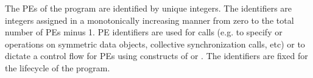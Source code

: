 The \ac{PE}{}s of the \openshmem{} program are identified by unique integers. The identifiers are integers assigned in a monotonically increasing 
manner from zero to the total number of \ac{PE}s minus 1. \ac{PE} identifiers are used for \openshmem{} calls (e.g. to specify \PUT{} or \GET{} operations on symmetric data objects, collective synchronization calls, etc) or to dictate a control flow for \ac{PE}s using constructs of \Clang{} or \Fortran. The identifiers are fixed for the lifecycle of the \openshmem{} program.


